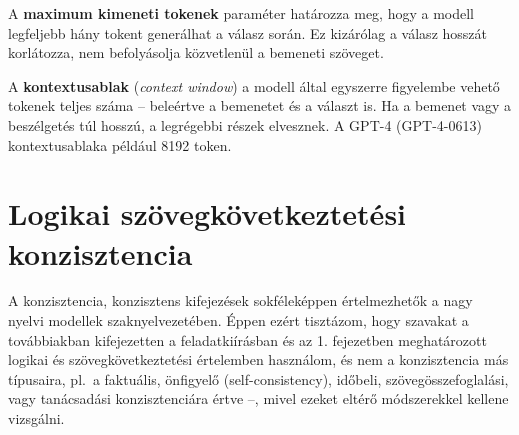 \documentclass[12pt]{report}
\begin{document}
    A \textbf{maximum kimeneti tokenek} paraméter határozza meg, hogy a modell legfeljebb hány tokent generálhat a válasz során.
    Ez kizárólag a válasz hosszát korlátozza, nem befolyásolja közvetlenül a bemeneti szöveget.


    A \textbf{kontextusablak} (\textit{context window}) a modell által egyszerre figyelembe vehető tokenek teljes száma – beleértve a bemenetet és a választ is.
    Ha a bemenet vagy a beszélgetés túl hosszú, a legrégebbi részek elvesznek.
    A GPT-4 (GPT-4-0613) kontextusablaka például 8192 token.
    ~\cite{openai_context_window}

    \section{Logikai szövegkövetkeztetési konzisztencia}
    A konzisztencia, konzisztens kifejezések sokféleképpen értelmezhetők a nagy nyelvi modellek szaknyelvezetében.
    Éppen ezért tisztázom, hogy szavakat a továbbiakban kifejezetten a feladatkiírásban és az 1. fejezetben meghatározott logikai és szövegkövetkeztetési értelemben használom, és nem a konzisztencia más típusaira, pl.\ a faktuális, önfigyelő (self-consistency), időbeli, szövegösszefoglalási, vagy tanácsadási konzisztenciára értve –, mivel ezeket eltérő módszerekkel kellene vizsgálni.


%
%
%
\end{document}
